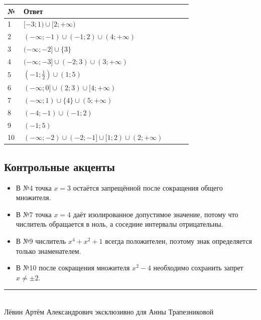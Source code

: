 \documentclass[a4paper,12pt]{article}
\begin{document}
\renewcommand{\arraystretch}{1.5}
\begin{longtable}{@{}p{0.08\linewidth}p{0.84\linewidth}@{}}
\toprule
\textbf{№} & \textbf{Ответ}\\
\midrule
1 & \(\displaystyle [-3;1)\cup[2;+\infty)\)\\
2 & \(\displaystyle (-\infty;-1)\cup(-1;2)\cup(4;+\infty)\)\\
3 & \(\displaystyle (-\infty;-2]\cup\{3\}\)\\
4 & \(\displaystyle (-\infty;-3]\cup(-2;3)\cup(3;+\infty)\)\\
5 & \(\displaystyle \left(-1;\frac12\right)\cup(1;5)\)\\
6 & \(\displaystyle (-\infty;0]\cup(2;3)\cup[4;+\infty)\)\\
7 & \(\displaystyle (-\infty;1)\cup\{4\}\cup(5;+\infty)\)\\
8 & \(\displaystyle (-4;-1)\cup(-1;2)\)\\
9 & \(\displaystyle (-1;5)\)\\
10 & \(\displaystyle (-\infty;-2)\cup(-2;-1]\cup[1;2)\cup(2;+\infty)\)\\
\bottomrule
\end{longtable}

\subsection*{Контрольные акценты}
\begin{itemize}
  \item В №4 точка \(x=3\) остаётся запрещённой после сокращения общего множителя.
  \item В №7 точка \(x=4\) даёт изолированное допустимое значение, потому что числитель обращается в ноль, а соседние интервалы отрицательны.
  \item В №9 числитель \(x^4+x^2+1\) всегда положителен, поэтому знак определяется только знаменателем.
  \item В №10 после сокращения множителя \(x^2-4\) необходимо сохранить запрет \(x\ne\pm2\).
\end{itemize}

\vfill
\begin{center}
\color{darkaccent}\rule{0.58\linewidth}{0.7pt}\\[3mm]
\small Лёвин Артём Александрович эксклюзивно для Анны Трапезниковой
\end{center}
\end{document}
